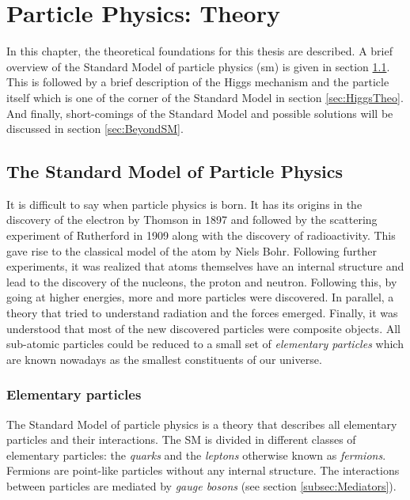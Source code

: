 \chapter{Particle Physics: Theory}
\label{chap:Theory}

In this chapter, the theoretical foundations for this thesis are described. A brief overview of the Standard Model of particle physics (\acrshort{sm}) is given in section \ref{sec:SM}. This is followed by a brief description of the Higgs mechanism and the particle itself which is one of the corner of the Standard Model in section \ref{sec:HiggsTheo}. And finally, short-comings of the Standard Model and possible solutions will be discussed in section \ref{sec:BeyondSM}.

\section{The Standard Model of Particle Physics}
\label{sec:SM}

It is difficult to say when particle physics is born. It has its origins in the discovery of the electron by Thomson \cite{JJThomson:1897} in 1897 and followed by the scattering experiment of Rutherford \cite{Rutherford:1911} in 1909 along with the discovery of radioactivity. This gave rise to the classical model of the atom by Niels Bohr. Following further experiments, it was realized that atoms themselves have an internal structure and lead to the discovery of the nucleons, the proton and neutron. Following this, by going at higher energies, more and more particles were discovered. In parallel, a theory that tried to understand radiation and the forces emerged. Finally, it was understood that most of the new discovered particles were composite objects. All sub-atomic particles could be reduced to a small set of \textit{elementary particles} which are known nowadays as the smallest constituents of our universe.

\subsection{Elementary particles}

The Standard Model of particle physics is a theory that describes all elementary particles and their interactions. The SM is divided in different classes of elementary particles: the \textit{quarks} and the \textit{leptons} otherwise known as \textit{fermions}. Fermions are point-like particles without any internal structure. The interactions between particles are mediated by \textit{gauge bosons} (see section \ref{subsec:Mediators}).

